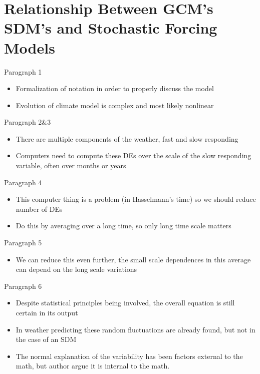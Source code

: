\documentclass[12pt]{article}
\begin{document}
\section{Relationship Between GCM's SDM's and Stochastic Forcing Models}
Paragraph 1
\begin{itemize}
\item Formalization of notation in order to properly discuss the model
\item Evolution of climate model is complex and most likely nonlinear
\end{itemize}
Paragraph 2\&3
\begin{itemize}
\item There are multiple components of the weather, fast and slow responding
\item Computers need to compute these DEs over the scale of the slow responding variable, often over months or years
\end{itemize}
Paragraph 4
\begin{itemize}
\item This computer thing is a problem (in Hasselmann's time) so we should reduce number of DEs
\item Do this by averaging over a long time, so only long time scale matters
\end{itemize}
Paragraph 5
\begin{itemize}
\item We can reduce this even further, the small scale dependences in this average can depend on the long scale variations
\end{itemize}
Paragraph 6
\begin{itemize}
\item Despite statistical principles being involved, the overall equation is still certain in its output
\item In weather predicting these random fluctuations are already found, but not in the case of an SDM
\item The normal explanation of the variability has been factors external to the math, but author argue it is internal to the math.
\end{itemize}
\end{document}
